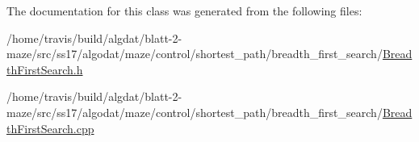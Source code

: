 The documentation for this class was generated from the following files\-:\begin{DoxyCompactItemize}
\item 
/home/travis/build/algdat/blatt-\/2-\/maze/src/ss17/algodat/maze/control/shortest\-\_\-path/breadth\-\_\-first\-\_\-search/\hyperlink{_breadth_first_search_8h}{Breadth\-First\-Search.\-h}\item 
/home/travis/build/algdat/blatt-\/2-\/maze/src/ss17/algodat/maze/control/shortest\-\_\-path/breadth\-\_\-first\-\_\-search/\hyperlink{_breadth_first_search_8cpp}{Breadth\-First\-Search.\-cpp}\end{DoxyCompactItemize}
